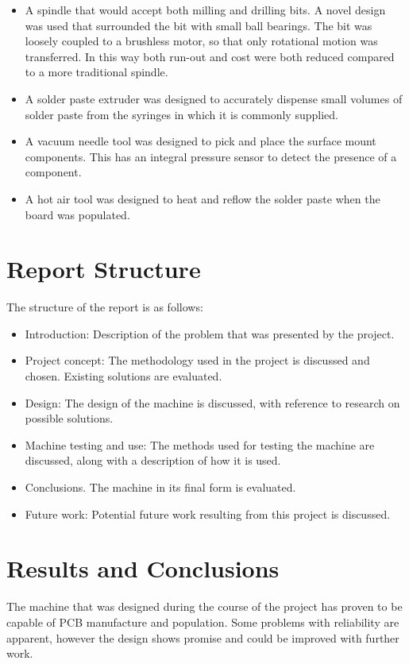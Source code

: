 \documentclass[a4paper,11pt]{article}  %
\begin{document}
\begin{itemize}\itemsep0em
\item
A spindle that would accept both milling and drilling bits. A novel design
was used that surrounded the bit with small ball bearings. The bit was loosely
coupled to a brushless motor, so that only rotational motion was transferred.
In this way both run-out and cost were both reduced compared to a more
traditional spindle.
\item
A solder paste extruder was designed to accurately dispense small volumes
of solder paste from the syringes in which it is commonly supplied.
\item
A vacuum needle tool was designed to pick and place the surface mount
components. This has an integral pressure sensor to detect the presence of
a component.
\item
A hot air tool was designed to heat and reflow the solder paste when the board
was populated.
\end{itemize}

\section*{Report Structure}
The structure of the report is as follows:

\begin{itemize}\itemsep0em
\item
Introduction: Description of the problem that was presented by the project.

\item
Project concept: The methodology used in the project is discussed and 
chosen. Existing solutions are evaluated.

\item
Design: The design of the machine is discussed, with reference to 
research on possible solutions.

\item
Machine testing and use: The methods used for testing the machine are
discussed, along with a description of how it is used.

\item
Conclusions. The machine in its final form is evaluated.

\item
Future work: Potential future work resulting from this project is discussed.
\end{itemize}

\section*{Results and Conclusions}
The machine that was designed during the course of the project has proven
to be capable of PCB manufacture and population. Some problems with
reliability are apparent, however the design shows promise and could be
improved with further work.
\end{document}

